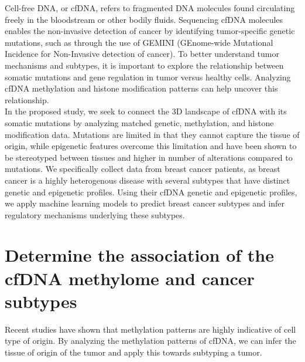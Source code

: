 \documentclass[11pt]{article}
\title{}
\author{}
\date{}
\begin{document}
\vspace{-1cm}

\noindent Cell-free DNA, or cfDNA, refers to fragmented DNA molecules found circulating freely in the bloodstream or other bodily fluids. 
Sequencing cfDNA molecules enables the non-invasive detection of cancer by identifying tumor-specific genetic mutations, such as through the use of GEMINI (GEnome-wide Mutational Incidence for Non-Invasive detection of cancer). \cite{bruhm_single-molecule_2023}
To better understand tumor mechanisms and subtypes, it is important to explore the relationship between somatic mutations and gene regulation in tumor versus healthy cells. Analyzing cfDNA methylation and histone modification patterns can help uncover this relationship. \cite{penny_chromatin-_2024} \\
In the proposed study, we seek to connect the 3D landscape of cfDNA with its somatic mutations by analyzing matched genetic, methylation, and histone modification data. 
Mutations are limited in that they cannot capture the tissue of origin, while epigenetic features overcome this limitation and have been shown to be stereotyped between tissues and higher in number of alterations compared to mutations. \cite{penny_chromatin-_2024} 
We specifically collect data from breast cancer patients, as breast cancer is a 
highly heterogenous disease with several subtypes that have distinct genetic and 
epigenetic profiles. Using their cfDNA genetic and epigenetic profiles, we apply 
machine learning models to predict breast cancer subtypes and infer 
regulatory mechanisms underlying these subtypes.
\section*{Determine the association of the cfDNA methylome and cancer subtypes}
Recent studies have shown that methylation patterns are highly indicative of cell type of origin.\cite{spector_methylome_2023} 
By analyzing the methylation patterns of cfDNA, we can infer the tissue of origin of the tumor and apply this towards subtyping a tumor.
\end{document}
